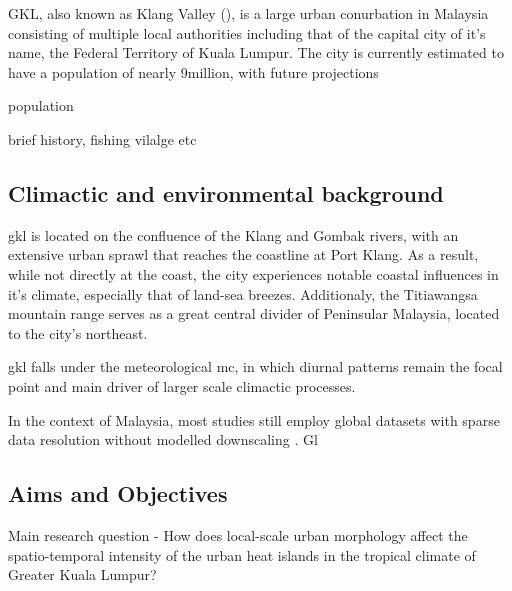 \gls{GKL}, also known as Klang Valley (\cite{epu}), is a large urban conurbation in Malaysia consisting of multiple local authorities including that of the capital city of it's name, the Federal Territory of Kuala Lumpur. The city is currently estimated to have a population of nearly 9million, with future projections 


population

brief history, fishing vilalge etc

\subsection{Climactic and environmental background}

\Gls{gkl} is located on the confluence of the Klang and Gombak rivers, with an extensive urban sprawl that reaches the coastline at Port Klang. As a result, while not directly at the coast, the city experiences notable coastal influences in it's climate, especially that of land-sea breezes. Additionaly, the Titiawangsa mountain range serves as a great central divider of Peninsular Malaysia, located to the city's northeast. 


\Gls{gkl} falls under the meteorological \Gls{mc}, in which diurnal patterns remain the focal point and main driver of larger scale climactic processes. 



In the context of Malaysia, most studies still employ global datasets with sparse data resolution without modelled downscaling . Gl

\subsection{Aims and Objectives}

{\textit\large{Main research question}}
- How does local-scale urban morphology affect the spatio-temporal intensity of the urban heat islands in the tropical climate of Greater Kuala Lumpur?


